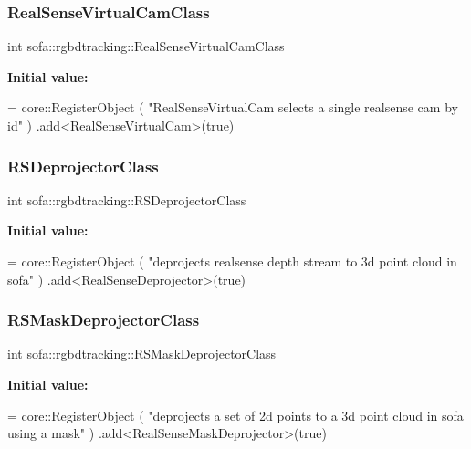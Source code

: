 \subsubsection{\texorpdfstring{Real\+Sense\+Virtual\+Cam\+Class}{RealSenseVirtualCamClass}}
{\footnotesize\ttfamily int sofa\+::rgbdtracking\+::\+Real\+Sense\+Virtual\+Cam\+Class}

{\bfseries Initial value\+:}
\begin{DoxyCode}
= core::RegisterObject ( \textcolor{stringliteral}{"RealSenseVirtualCam selects a single realsense cam by id"} )
    .add<RealSenseVirtualCam>(\textcolor{keyword}{true})
\end{DoxyCode}
\mbox{\label{namespacesofa_1_1rgbdtracking_ac3f6d225dbe5a6782bfbb716bc3940e9}} 
\subsubsection{\texorpdfstring{R\+S\+Deprojector\+Class}{RSDeprojectorClass}}
{\footnotesize\ttfamily int sofa\+::rgbdtracking\+::\+R\+S\+Deprojector\+Class}

{\bfseries Initial value\+:}
\begin{DoxyCode}
= core::RegisterObject ( \textcolor{stringliteral}{"deprojects realsense depth stream to 3d point cloud in sofa"} )
        .add<RealSenseDeprojector>(\textcolor{keyword}{true})
\end{DoxyCode}
\mbox{\label{namespacesofa_1_1rgbdtracking_a585e4b070b41993d28e4c727bcd0b836}} 
\subsubsection{\texorpdfstring{R\+S\+Mask\+Deprojector\+Class}{RSMaskDeprojectorClass}}
{\footnotesize\ttfamily int sofa\+::rgbdtracking\+::\+R\+S\+Mask\+Deprojector\+Class}

{\bfseries Initial value\+:}
\begin{DoxyCode}
= core::RegisterObject ( \textcolor{stringliteral}{"deprojects a set of 2d points to a 3d point cloud in sofa using a mask"} )
        .add<RealSenseMaskDeprojector>(\textcolor{keyword}{true})
\end{DoxyCode}
\mbox{\label{namespacesofa_1_1rgbdtracking_a615e1879a9190fb07f0669c146ecc164}} 
